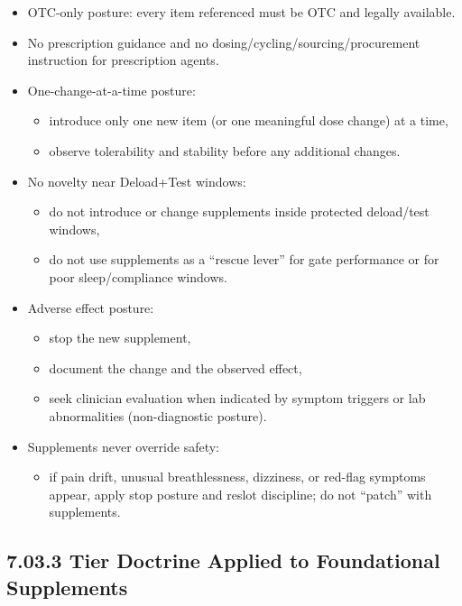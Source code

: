 \documentclass[10pt]{article}
\begin{document}
\begin{itemize}
\item OTC-only posture: every item referenced must be OTC and legally available.
\item No prescription guidance and no dosing/cycling/sourcing/procurement instruction for prescription agents.
\item One-change-at-a-time posture:
  \begin{itemize}
  \item introduce only one new item (or one meaningful dose change) at a time,
  \item observe tolerability and stability before any additional changes.
  \end{itemize}
\item No novelty near Deload+Test windows:
  \begin{itemize}
  \item do not introduce or change supplements inside protected deload/test windows,
  \item do not use supplements as a “rescue lever” for gate performance or for poor sleep/compliance windows.
  \end{itemize}
\item Adverse effect posture:
  \begin{itemize}
  \item stop the new supplement,
  \item document the change and the observed effect,
  \item seek clinician evaluation when indicated by symptom triggers or lab abnormalities (non-diagnostic posture).
  \end{itemize}
\item Supplements never override safety:
  \begin{itemize}
  \item if pain drift, unusual breathlessness, dizziness, or red-flag symptoms appear, apply stop posture and reslot discipline; do not “patch” with supplements.
  \end{itemize}
\end{itemize}

\subsection*{7.03.3 Tier Doctrine Applied to Foundational Supplements}
{}
\end{document}
